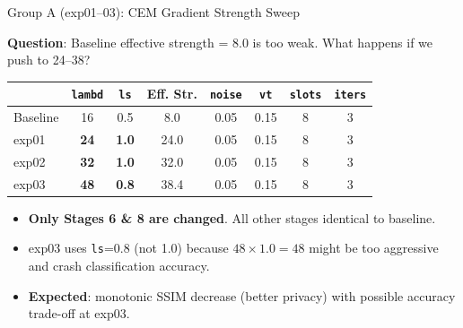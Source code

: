 \documentclass[aspectratio=169, 10pt]{beamer}
\newcommand{\param}[1]{\textcolor{paramred}{\texttt{#1}}}
\newcommand{\good}[1]{\textcolor{goodgreen}{#1}}
\newcommand{\warn}[1]{\textcolor{warnorg}{#1}}
\begin{document}
\begin{frame}{Group A (exp01--03): CEM Gradient Strength Sweep}

\textbf{Question}: Baseline effective strength = 8.0 is too weak. What happens if we push to 24--38?

\vspace{0.2cm}
\begin{center}
\small
\begin{tabular}{lccccccc}
\toprule
& \param{lambd} & \param{ls} & \textbf{Eff. Str.} & \param{noise} & \param{vt} & \param{slots} & \param{iters} \\
\midrule
\rowcolor{lightgray}
Baseline & 16 & 0.5 & \warn{8.0} & 0.05 & 0.15 & 8 & 3 \\
exp01 & \textbf{24} & \textbf{1.0} & \good{24.0} & 0.05 & 0.15 & 8 & 3 \\
exp02 & \textbf{32} & \textbf{1.0} & \good{32.0} & 0.05 & 0.15 & 8 & 3 \\
exp03 & \textbf{48} & \textbf{0.8} & \good{38.4} & 0.05 & 0.15 & 8 & 3 \\
\bottomrule
\end{tabular}
\end{center}

\vspace{0.2cm}
\begin{itemize}
    \item \textbf{Only Stages 6 \& 8 are changed}. All other stages identical to baseline.
    \item exp03 uses \param{ls}=0.8 (not 1.0) because $48 \times 1.0 = 48$ might be too aggressive and crash classification accuracy.
    \item \textbf{Expected}: monotonic SSIM decrease (better privacy) with possible accuracy trade-off at exp03.
\end{itemize}

\end{frame}
\end{document}
